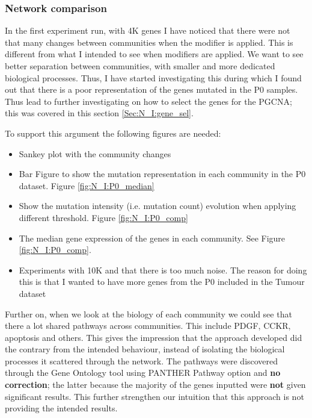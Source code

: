\subsubsection{Network comparison}


\newpage

In the first experiment run, with 4K genes I have noticed that there were not that many changes between communities when the modifier is applied. This is different from what I intended to see when modifiers are applied. We want to see better separation between communities, with smaller and more dedicated biological processes. Thus, I have started investigating this during which I found out that there is a poor representation of the genes mutated in the P0 samples. Thus lead to further investigating on how to select the genes for the PGCNA; this was covered in this section \ref{Sec:N_I:gene_sel}.

To support this argument the following figures are needed:
\begin{itemize}
    \item Sankey plot with the community changes
    \item Bar Figure to show the mutation representation in each community in the P0 dataset. Figure \ref{fig:N_I:P0_median}
    \item Show the mutation intensity (i.e. mutation count) evolution when applying different threshold.  Figure \ref{fig:N_I:P0_comp}
    \item The median gene expression of the genes in each community. See Figure \ref{fig:N_I:P0_comp}.
    \item Experiments with 10K and that there is too much noise. The reason for doing this is that I wanted to have more genes from the P0 included in the Tumour dataset
\end{itemize}

Further on, when we look at the biology of each community we could see that there a lot shared pathways across communities. This include PDGF, CCKR, apoptosis and others. This gives the impression that the approach developed did the contrary from the intended behaviour, instead of isolating the biological processes it scattered through the network. The pathways were discovered through the Gene Ontology tool using PANTHER Pathway option and \textbf{no correction}; the latter because the majority of the genes inputted were \textbf{not} given significant results. This further strengthen our intuition that this approach is not providing the intended results.

